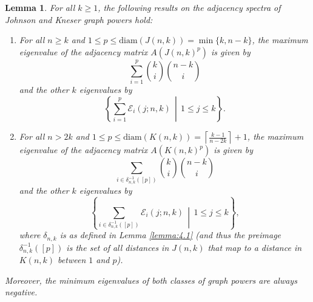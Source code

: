 \documentclass{article}
\def\Ein{\mathcal{E}}
\numberwithin{equation}{section}
\theoremstyle{plain}
\newtheorem{lemma}[theorem]{Lemma}
\begin{document}
\begin{lemma}\label{lemma:4.2}
    For all $k \ge 1$, the following results on the adjacency spectra of Johnson and Kneser graph powers hold:
    \begin{enumerate}[label=(\roman*)]
        \item For all $n \ge k$ and $1 \le p \le \mathrm{diam}(J(n, k)) = \min\{k, n - k\}$, the maximum eigenvalue of the adjacency matrix $A(J(n, k)^p)$ is given by
        \[\sum_{i = 1}^p \binom{k}{i} \binom{n - k}{i}\]
        and the other $k$ eigenvalues by
        \[\left\{\sum_{i = 1}^p \Ein_i(j; n, k)\, \middle|\, 1 \le j \le k\right\}.\]
        \item For all $n > 2k$ and $1 \le p \le \mathrm{diam}(K(n, k)) = \left\lceil\frac{k - 1}{n - 2k}\right\rceil + 1$, the maximum eigenvalue of the adjacency matrix $A(K(n, k)^p)$ is given by
        \[\sum_{i \in \delta_{n,k}^{-1}([p])} \binom{k}{i} \binom{n - k}{i}\]
        and the other $k$ eigenvalues by
        \[\left\{\sum_{i \in \delta_{n,k}^{-1}([p])} \Ein_i(j; n, k)\, \middle|\, 1 \le j \le k\right\},\]
        where $\delta_{n,k}$ is as defined in Lemma \ref{lemma:4.1} (and thus the preimage $\delta_{n,k}^{-1}([p])$ is the set of all distances in $J(n, k)$ that map to a distance in $K(n, k)$ between $1$ and $p$).
    \end{enumerate}
    Moreover, the minimum eigenvalues of both classes of graph powers are always negative.
\end{lemma}
\end{document}
